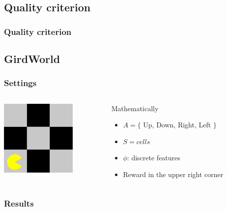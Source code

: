 \documentclass{beamer}
\begin{document}
\subsection{Quality criterion}
\label{sec-4_2}
\begin{frame}
\frametitle{Quality criterion}
\label{sec-4_2_1}

\center
\resizebox{.9\columnwidth}{!}{}
\end{frame}
\subsection{GirdWorld}
\label{sec-4_3}
\begin{frame}
\frametitle{Settings}
\label{sec-4_3_1}
\begin{columns}
\begin{column}{0.4\textwidth}
\label{sec-4_3_1_1}

     \includegraphics[width=10em]{ML.png}
\end{column}
\begin{column}{0.4\textwidth}
\begin{block}{Mathematically}
\label{sec-4_3_1_2}

     

\begin{itemize}
\item $A = \{$ Up, Down, Right, Left $\}$
\item $S = {cells}$
\item $\phi$: discrete features
\item Reward in the upper right corner
\end{itemize}
\end{block}
\end{column}
\end{columns}
\end{frame}
\begin{frame}
\frametitle{Results}
\label{sec-4_3_2}

\center
\resizebox{.9\columnwidth}{!}{}
\end{frame}
\end{document}
